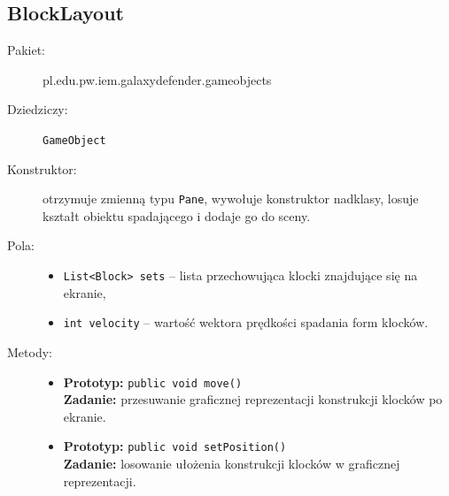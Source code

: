 \documentclass[a4paper]{article}
\newcommand{\prog}{\texttt}
\begin{document}
\subsection{BlockLayout}
\begin{description}
    \item[Pakiet:] pl.edu.pw.iem.galaxydefender.gameobjects
    \item[Dziedziczy:] \prog{GameObject}
    \item[Konstruktor:] otrzymuje zmienną typu \prog{Pane}, wywołuje konstruktor nadklasy, losuje kształt obiektu spadającego i dodaje go do sceny.
    \item[Pola:] \hfill
    \begin{itemize}
        \item \prog{List<Block> sets} -- lista przechowująca klocki znajdujące się na ekranie,
        \item \prog{int velocity} -- wartość wektora prędkości spadania form klocków.
    \end{itemize}
    \item[Metody:] \hfill
    \begin{itemize}
        \item \textbf{Prototyp:} \prog{public void move()}\\\textbf{Zadanie:} przesuwanie graficznej reprezentacji konstrukcji klocków po ekranie.
        \item \textbf{Prototyp:} \prog{public void setPosition()}\\\textbf{Zadanie:} losowanie ułożenia konstrukcji klocków w graficznej reprezentacji.
    \end{itemize}
\end{description}
\end{document}
